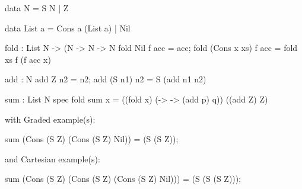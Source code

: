 \begin{enumerate}
\begin{granule}
data N = S N | Z 

data List a = Cons a (List a) | Nil 

fold : List N %
     -> (N %
     -> N %
     -> N %
fold Nil f acc = acc;
fold (Cons x xs) f acc =  fold xs f (f acc x)

add : N %
add Z n2 = n2; 
add (S n1) n2 = S (add n1 n2)

sum : List N %
spec 
    fold %
sum x = ((fold x) (\p -> \q -> (add p) q)) ((add Z) Z)
\end{granule}
with Graded example(s):
\begin{granule}
sum (Cons (S Z) (Cons (S Z) Nil)) = (S (S Z));
\end{granule}
and Cartesian example(s):
\begin{granule}
sum (Cons (S Z) (Cons (S Z) (Cons (S Z) Nil))) = (S (S (S Z)));
\end{granule}
\end{enumerate}

